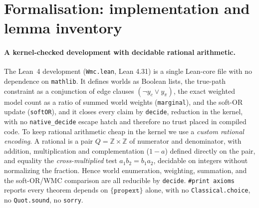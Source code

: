 \documentclass[letterpaper]{article}
\begin{document}
\section{Formalisation: implementation and lemma inventory}\label{app:lean}

\paragraph{A kernel-checked development with decidable rational arithmetic.}
The Lean~4 development (\texttt{Wmc.lean}, Lean 4.31) is a single Lean-core file with no
dependence on \texttt{mathlib}. It defines worlds as Boolean lists, the true-path constraint
as a conjunction of edge clauses $(\neg y_c \vee y_\pi)$, the exact weighted model count as a
ratio of summed world weights (\texttt{marginal}), and the soft-OR update (\texttt{softOR}),
and it closes every claim by \texttt{decide}, reduction in the kernel, with no
\texttt{native\_decide} escape hatch and therefore no trust placed in compiled code. To keep
rational arithmetic cheap in the kernel we use a \emph{custom rational encoding}. A rational
is a pair $Q=\mathbb{Z}\times\mathbb{Z}$ of numerator and denominator, with addition,
multiplication and complementation ($1-a$) defined directly on the pair, and equality the
\emph{cross-multiplied} test $a_1 b_2 = b_1 a_2$, decidable on integers without normalizing the
fraction. Hence world enumeration, weighting, summation, and the soft-OR/WMC comparison are all
reducible by \texttt{decide}. \texttt{\#print axioms} reports every theorem depends on
$\{\texttt{propext}\}$ alone, with no \texttt{Classical.choice}, no \texttt{Quot.sound}, no
\texttt{sorry}.
\end{document}
